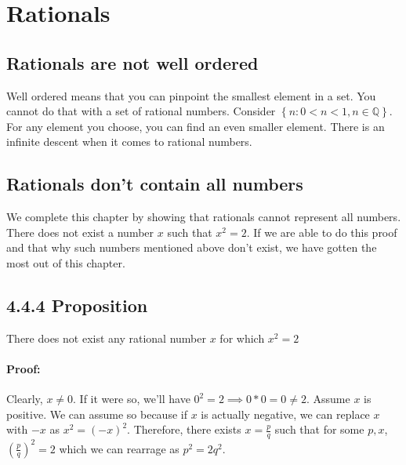 \documentclass{report}
\begin{document}
\section{Rationals}
\subsection*{Rationals are not well ordered}
Well ordered means that you can pinpoint the smallest element in a set. You cannot do that with a set of rational numbers. Consider $\left\{ n: 0 < n < 1, n \in \mathbb{Q} \right\} $. For any element you choose, you can find an even smaller element. There is an infinite descent when it comes to rational numbers.

\subsection*{Rationals don't contain all numbers}
We complete this chapter by showing that rationals cannot represent all numbers. There does not exist a number $x$ such that  $x^2 = 2$. If we are able to do this proof and that why such numbers mentioned above don't exist, we have gotten the most out of this chapter. 

\subsection*{4.4.4 Proposition}
There does not exist any rational number $x$ for which  $x^2 = 2$
 \paragraph{Proof: }
Clearly, $x \ne 0$. If it were so, we'll have $0^2 = 2 \implies 0*0 = 0 \ne 2$. Assume $x$ is positive. We can assume so because if  $x$ is actually negative, we can replace  $x$ with  $-x$ as  $x^2 = \left( -x \right) ^2$.
Therefore, there exists $x = \frac{p}{q}$ such that for some $p,x$, $\left( \frac{p}{q} \right)^2 = 2$ which we can rearrage as $p^2 = 2q^2$.
\end{document}
